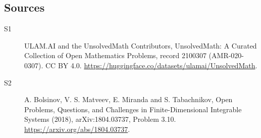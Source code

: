 \documentclass[11pt]{article}
\begin{document}
\subsection{Sources}
\begin{description}
\item[\hypertarget{source:2100307:1}{S1}] ULAM.AI and the UnsolvedMath Contributors, UnsolvedMath: A Curated Collection of Open Mathematics Problems, record 2100307 (AMR-020-0307). CC BY 4.0. \url{https://huggingface.co/datasets/ulamai/UnsolvedMath}.
\item[\hypertarget{source:2100307:2}{S2}] A. Bolsinov, V. S. Matveev, E. Miranda and S. Tabachnikov, Open Problems, Questions, and Challenges in Finite-Dimensional Integrable Systems (2018), arXiv:1804.03737, Problem 3.10. \url{https://arxiv.org/abs/1804.03737}.
\end{description}
\label{end:2100307}
\end{document}
